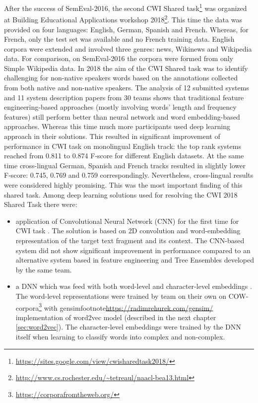 After the success of SemEval-2016, the second CWI Shared task\footnote{\url{https://sites.google.com/view/cwisharedtask2018/}} was organized at Building Educational Applications workshop 2018\footnote{\url{http://www.cs.rochester.edu/~tetreaul/naacl-bea13.html}}. This time the data was provided on four languages: English, German, Spanish and French. Whereas, for French, only the test set was available and no French training data. English corpora were extended and involved three genres: news, Wikinews and Wikipedia data. For comparison, on SemEval-2016 the corpora were formed from only Simple Wikipedia data. In 2018 the aim of the CWI Shared
task was to identify challenging for non-native speakers words based on the annotations collected from both native and non-native speakers. 
The analysis \citep{Yimam-BEA2018} of 12 submitted systems and 11 system description papers from 30 teams shows that traditional feature engineering-based approaches (mostly involving words' length and frequency features) still perform better than neural network and word embedding-based approaches. Whereas this time much more participants used deep learning approach in their solutions. This resulted in significant improvement of performance in CWI task on monolingual English track: the top rank systems reached from 0.811 to 0.874 F-score for different English datasets. At the same time cross-lingual German, Spanish and French tracks resulted in slightly lower F-score: 0.745, 0.769 and 0.759 correspondingly. Nevertheless, cross-lingual results were considered highly promising. This was the most important finding of this shared task. 
Among deep learning solutions used for resolving the CWI 2018 Shared Task  there were:
\begin{itemize}
    \item application of Convolutional Neural Network (CNN) for the first time for CWI task \citep{Aroyehun-BEA2018}. The solution is based on 2D convolution and word-embedding representation of the target text fragment and its context. The CNN-based system did not show significant improvement in performance compared to an alternative system based in feature engineering and Tree Ensembles developed by the same team. 
    
    \item a DNN which was feed with both word-level and character-level embeddings \citep{DeHertog-ACL2018}. The word-level representations were trained by team on their own on COW-corpora\footnote{\url{https://corporafromtheweb.org/}} with gensimfootnote{\url{https://radimrehurek.com/gensim/}} implementation of word2vec model (described in the next chapter \ref{sec:word2vec}). The character-level embeddings were trained by the DNN itself when learning to classify words into complex and non-complex.
\end{itemize}

